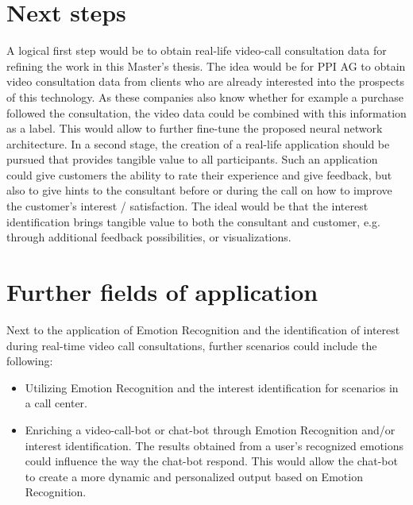 \section{Next steps}
A logical first step would be to obtain real-life video-call consultation data for refining the work in this Master's thesis. The idea would be for PPI AG to obtain video consultation data from clients who are already interested into the prospects of this technology. As these companies also know whether for example a purchase followed the consultation, the video data could be combined with this information as a label. This would allow to further fine-tune the proposed neural network architecture.
\newline\newline
In a second stage, the creation of a real-life application should be pursued that provides tangible value to all participants. Such an application could give customers the ability to rate their experience and give feedback, but also to give hints to the consultant before or during the call on how to improve the customer's interest / satisfaction. The ideal would be that the interest identification brings tangible value to both the consultant and customer, e.g. through additional feedback possibilities, or visualizations.


\section{Further fields of application}
Next to the application of Emotion Recognition and the identification of interest during real-time video call consultations, further scenarios could include the following:\newline
\begin{itemize}
    \item Utilizing Emotion Recognition and the interest identification for scenarios in a call center.
    \item Enriching a video-call-bot or chat-bot through Emotion Recognition and/or interest identification. The results obtained from a user's recognized emotions could influence the way the chat-bot respond. This would allow the chat-bot to create a more dynamic and personalized output based on Emotion Recognition.
\end{itemize}


